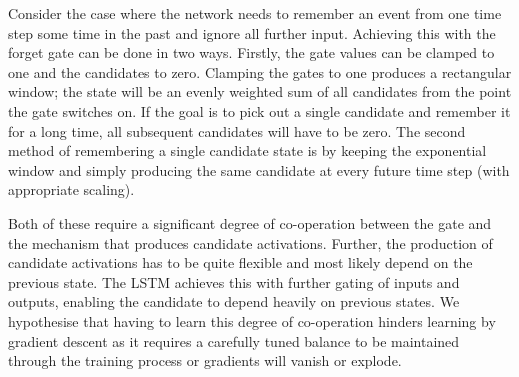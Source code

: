 Consider the case where the network needs to remember an event from one time step some time in the
past and ignore all further input. Achieving this with the forget gate can be done in two
ways. Firstly, the gate values can be clamped to one and the
candidates to zero. Clamping the gates to one produces a rectangular window; the state will be an
evenly weighted sum of all candidates from the point the gate switches on. If the goal is to pick
out a single candidate and remember it for a long time, all subsequent
candidates will have to be zero. 
The second method of remembering a single candidate state is by keeping the exponential window 
and simply producing the same candidate at every future time step (with
appropriate scaling).

Both of these require a significant degree of co-operation between the gate and the mechanism that
produces candidate activations. Further, the production of candidate activations has to be quite
flexible and most likely depend on the previous state. The LSTM achieves this with further gating
of inputs and outputs, enabling the candidate to depend heavily on previous states. We hypothesise that
having to learn this degree of co-operation hinders learning by gradient descent as it requires a
carefully tuned balance to be maintained through the training process or gradients will vanish or
explode.


